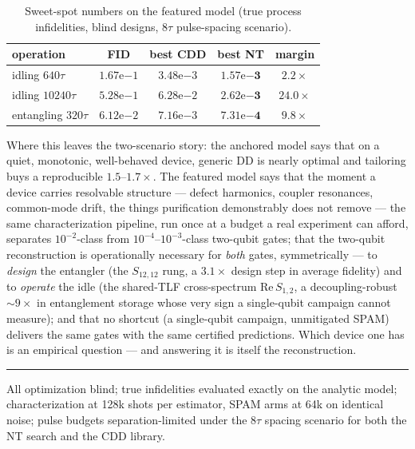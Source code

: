 \documentclass[10pt]{article}
\begin{document}
\begin{table}[h!]
\centering\small
\begin{tabular}{lcccc}
\toprule
operation & FID & best CDD & best NT & margin \\
\midrule
idling $640\tau$ & $1.67\mathrm{e}{-1}$ & $3.48\mathrm{e}{-3}$ & $\mathbf{1.57\mathrm{e}{-3}}$ & $2.2\times$ \\
idling $10240\tau$ & $5.28\mathrm{e}{-1}$ & $6.28\mathrm{e}{-2}$ & $\mathbf{2.62\mathrm{e}{-3}}$ & $24.0\times$ \\
entangling $320\tau$ & $6.12\mathrm{e}{-2}$ & $7.16\mathrm{e}{-3}$ & $\mathbf{7.31\mathrm{e}{-4}}$ & $9.8\times$ \\
\bottomrule
\end{tabular}
\caption{Sweet-spot numbers on the featured model (true process
infidelities, blind designs, $8\tau$ pulse-spacing scenario).}
\label{tab:sweet}
\end{table}

\vspace{0.3em}
Where this leaves the two-scenario story: the anchored model says that on a
quiet, monotonic, well-behaved device, generic DD is nearly optimal and
tailoring buys a reproducible $1.5$--$1.7\times$. The featured model says
that the moment a device carries resolvable structure --- defect harmonics,
coupler resonances, common-mode drift, the things purification demonstrably
does not remove --- the same characterization pipeline, run once at a budget
a real experiment can afford, separates $10^{-2}$-class from
$10^{-4}$--$10^{-3}$-class two-qubit gates; that the two-qubit reconstruction
is operationally necessary for \emph{both} gates, symmetrically --- to
\emph{design} the entangler (the $S_{12,12}$ rung, a $3.1\times$ design step in
average fidelity) and to \emph{operate} the idle (the shared-TLF cross-spectrum
$\mathrm{Re}\,S_{1,2}$, a decoupling-robust $\sim 9\times$ in entanglement
storage whose very sign a single-qubit campaign cannot measure); and that no
shortcut (a single-qubit campaign, unmitigated SPAM) delivers the same gates
with the same certified predictions. Which device one has is an empirical
question --- and answering it is itself the reconstruction.

\vspace{0.4em}
\hrule
\vspace{0.3em}
{\footnotesize All optimization blind; true infidelities evaluated exactly
on the analytic model; characterization at 128k shots per estimator, SPAM
arms at 64k on identical noise; pulse budgets separation-limited under the
$8\tau$ spacing scenario for both the NT search and the CDD library.}
\end{document}
